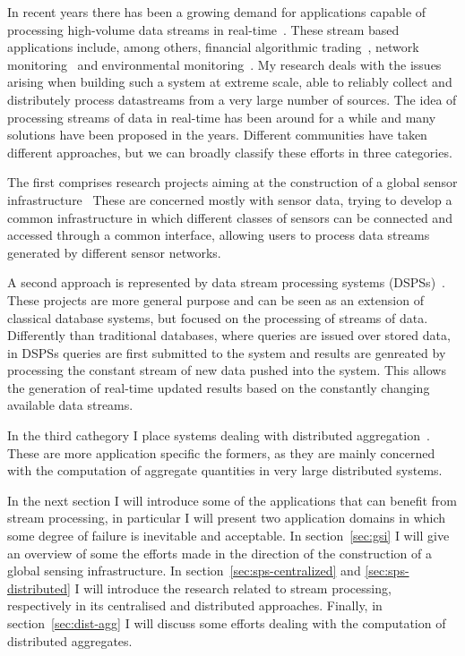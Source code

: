 In recent years there has been a growing demand for applications capable of processing high-volume data streams in
real-time~\cite{8-reqs}. These stream based applications include, among others, financial algorithmic
trading~\cite{streambase-algo}, network monitoring~\cite{phi} and environmental monitoring~\cite{swissexp}. 
My research deals with the issues arising when building such a system at extreme scale, able to reliably collect and
distributely process datastreams from a very large number of sources.
The idea of processing streams of data in real-time has been around for a while and many solutions have been proposed in the years.
Different communities have taken different approaches, but we can broadly classify these efforts in three categories.  

The first comprises research projects aiming at the construction of a global sensor infrastructure~\cite{senseweb, gsn,
irisnet} These are concerned mostly with sensor data, trying to develop a common infrastructure in which different
classes of sensors can be connected and accessed through a common interface, allowing users to process data streams
generated by different sensor networks.
 
A second approach is represented by data stream processing systems (DSPSs)~\cite{stream, aurora-and-medusa,
borealis-design, niagaracq, telegraphcq, xstream}. These projects are more general purpose and can be seen as an
extension of classical database systems, but focused on the processing of streams of data. Differently than traditional
databases, where queries are issued over stored data, in DSPSs queries are first submitted to the system and results are
genreated by processing the constant stream of new data pushed into the system.  This allows the generation of real-time
updated results based on the constantly changing available data streams. 

In the third cathegory I place systems dealing with distributed aggregation~\cite{sdims, gossip-aggregates, astrolabe,
dec-net-mon, network-imprecision}.  These are more application specific the formers, as they are mainly concerned with the
computation of aggregate quantities in very large distributed systems.  

In the next section I will introduce some of the applications that can benefit from stream processing, in particular I
will present two application domains in which some degree of failure is inevitable and acceptable.  In
section~\ref{sec:gsi} I will give an overview of some the efforts made in the direction of the construction of a global
sensing infrastructure. In section~\ref{sec:sps-centralized} and \ref{sec:sps-distributed} I will introduce the research
related to stream processing, respectively in its centralised and distributed approaches. Finally, in
section~\ref{sec:dist-agg} I will discuss some efforts dealing with the computation of distributed aggregates.


